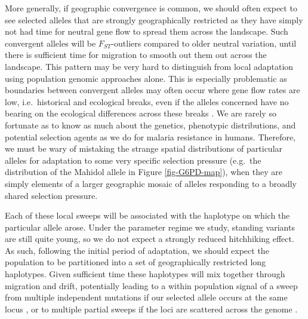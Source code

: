 \documentclass{article}
\begin{document}
More generally, if geographic convergence is common, we should often expect to see
selected alleles that are strongly geographically restricted as they
have simply not had time for neutral gene flow to spread them across the
landscape. Such convergent alleles will be $F_{ST}$-outliers compared to
  older neutral variation, until there is sufficient time for
  migration to smooth out them out across the landscape.
This pattern may be very hard to distinguish from local adaptation using population genomic approaches
alone. This is especially problematic as boundaries between convergent alleles may often
occur where gene flow rates are low, i.e.\ historical and ecological breaks, even if
the alleles concerned have no bearing on the ecological differences
across these breaks \citep[see][for a wide-ranging discussion of how allelic differentiation may build along particular zones]{bierne2011coupling}. 
We are rarely so fortunate as to know as much about the genetics, phenotypic distributions, 
and potential selection agents as we do for malaria resistance in humans. 
Therefore, we must be wary of mistaking the strange spatial distributions of particular alleles 
for adaptation to some very specific selection pressure (e.g.\ the distribution of the Mahidol allele in Figure \ref{fig-G6PD-map}), 
when they are simply elements of a larger geographic mosaic of alleles responding to a broadly shared selection pressure. 


Each of these local sweeps will be associated with the haplotype on which the particular allele arose. 
Under the parameter regime we study,
standing variants are still quite young, 
so we do not expect a strongly reduced hitchhiking effect. 
As such, following the initial period of
adaptation, we should expect the population to be partitioned into a
set of geographically restricted long haplotypes. 
Given sufficient time these haplotypes will mix together through
migration and drift, 
potentially leading to a within population signal of a sweep from multiple independent
mutations if our selected allele occurs at the same locus \citep{softsweepsIII}, 
or to multiple partial sweeps if the loci are scattered across the
genome \citep{CoopRalph:12}.
\end{document}
